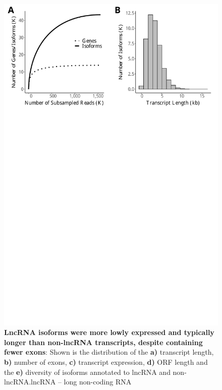\begin{figure}[htp]
	\begin{center}
		\includegraphics[page=7,trim={0 1cm 0 0},scale = 0.55]{Figures/IsoSeqWholeTranscriptome.pdf}
	\end{center}
	\captionsetup{width=0.95\textwidth}
	\caption[Characterisation of LncRNA in Whole Transcriptome runs]%
	{\textbf{LncRNA isoforms were more lowly expressed and typically longer than non-lncRNA transcripts, despite containing fewer exons}: Shown is the distribution of the \textbf{a)} transcript length, \textbf{b)} number of exons, \textbf{c)} transcript expression, \textbf{d)} ORF length and the \textbf{e)} diversity of isoforms annotated to lncRNA and non-lncRNA.lncRNA – long non-coding RNA}
	\label{fig:isoseq_whole_lncRNA}
\end{figure}

